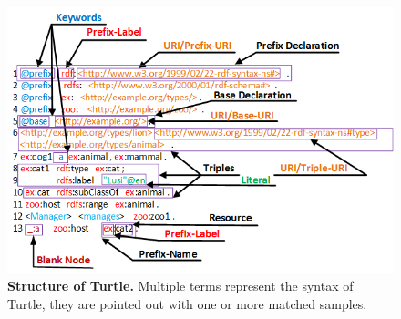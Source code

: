 \begin{figure}[ht]
	\begin{center}
		\includegraphics[scale=0.8,angle=0]{images/TurtleStructure.png}
		\setlength\belowcaptionskip{-5mm}
		\caption{\textbf{Structure of Turtle.} Multiple terms represent the syntax of Turtle, they are pointed out with one or more matched samples.}
		\label{Fig:TurtleStructure}
	\end{center}
\end{figure}
